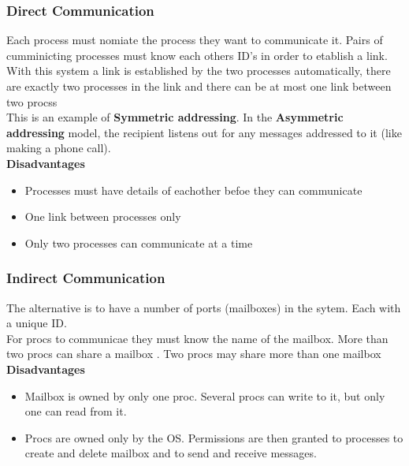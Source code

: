 \documentclass[a4paper, 10pt]{article}
\begin{document}
\subsubsection{Direct Communication}
Each process must nomiate the process they want to communicate it. Pairs of cumminicting processes must know each others ID's in order to etablish a link. With this system a link is established by the two processes automatically, there are exactly two processes in the link and there can be at most one link between two procss\\[2ex]
This is an example of \textbf{Symmetric addressing}. In the \textbf{Asymmetric addressing} model, the recipient listens out for any messages addressed to it (like making a phone call).\\[2ex]
\textbf{Disadvantages}
\begin{itemize}
    \item Processes must have details of eachother befoe they can communicate
    \item One link between processes only
    \item Only two processes can communicate at a time
\end{itemize}
\subsubsection{Indirect Communication}
The alternative is to have a number of ports (mailboxes) in the sytem. Each with a unique ID. \\[2ex]
For procs to communicae they must know the name of the mailbox. More than two procs can share a mailbox . Two procs may share more than one mailbox \\[2ex]
\textbf{Disadvantages}
\begin{itemize}
    \item Mailbox is owned by only one proc. Several procs can write to it, but only one can read from it.
    \item Procs are owned only by the OS. Permissions are then granted to processes to create and delete mailbox and to send and receive messages.
\end{itemize}
\end{document}

